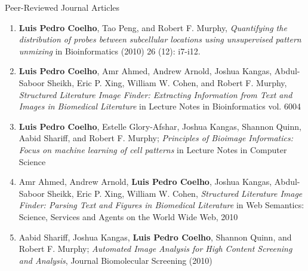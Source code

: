 \documentclass{article}
\renewcommand\subsection[1]{%
    \par\vspace{.1em}%
    {\hspace{1em}\subsubhead #1}%
    \par\vspace{.2em}%
}
\begin{document}
\subsection{Peer-Reviewed Journal Articles}
\begin{enumerate}
\item \textbf{Luis Pedro Coelho}, Tao Peng, and Robert F. Murphy,
\emph{Quantifying the distribution of probes between subcellular locations
using unsupervised pattern unmixing} in Bioinformatics (2010) 26 (12): i7-i12.
\item \textbf{Luis Pedro Coelho}, Amr Ahmed, Andrew Arnold, Joshua Kangas,
Abdul-Saboor Sheikh, Eric P. Xing, William W. Cohen, and Robert F. Murphy,
\emph{Structured Literature Image Finder: Extracting Information from Text and
Images in Biomedical Literature} in Lecture Notes in Bioinformatics vol. 6004
\item \textbf{Luis Pedro Coelho}, Estelle Glory-Afshar, Joshua Kangas, Shannon
Quinn, Aabid Shariff, and Robert F. Murphy; \emph{Principles of Bioimage
Informatics: Focus on machine learning of cell patterns} in Lecture Notes in
Computer Science
\item Amr Ahmed, Andrew Arnold, \textbf{Luis Pedro Coelho}, Joshua Kangas,
Abdul-Saboor Sheikk, Eric P. Xing, William W. Cohen, \emph{Structured
Literature Image Finder: Parsing Text and Figures in Biomedical Literature} in
Web Semantics: Science, Services and Agents on the World Wide Web, 2010
\item Aabid Shariff, Joshua Kangas, \textbf{Luis Pedro Coelho}, Shannon Quinn,
and Robert F. Murphy; \emph{Automated Image Analysis for High Content Screening
and Analysis}, Journal Biomolecular Screening (2010)
\end{enumerate}
\end{document}
